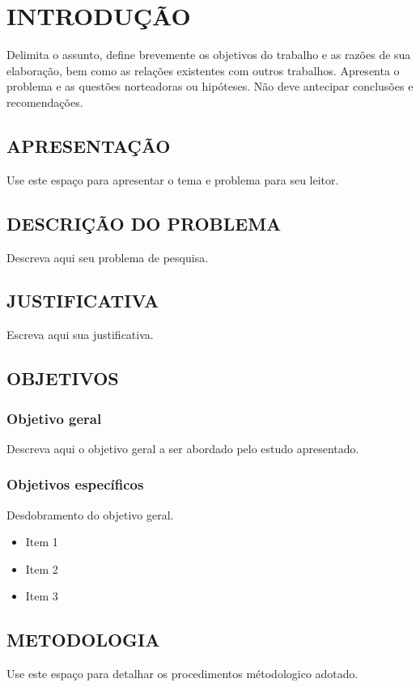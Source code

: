 \chapter{INTRODUÇÃO} %
Delimita o assunto, define brevemente os objetivos do trabalho e as razões de sua elaboração, bem como as relações existentes com outros trabalhos. Apresenta o problema e as questões norteadoras ou hipóteses. Não deve antecipar conclusões e recomendações.

\section{APRESENTAÇÃO}
Use este espaço para apresentar o tema e problema para seu leitor.

\section{DESCRIÇÃO DO PROBLEMA}
Descreva aqui seu problema de pesquisa.

\section{JUSTIFICATIVA}
Escreva aqui sua justificativa.

\section{OBJETIVOS}

\subsection{Objetivo geral}
Descreva aqui o objetivo geral a ser abordado pelo estudo apresentado.

\subsection{Objetivos específicos}
Desdobramento do objetivo geral. 
 \begin{itemize}
	\item Item 1
	\item Item 2
	\item Item 3
\end{itemize}

 \section{METODOLOGIA}
 
 Use este espaço para detalhar os procedimentos métodologico adotado.
